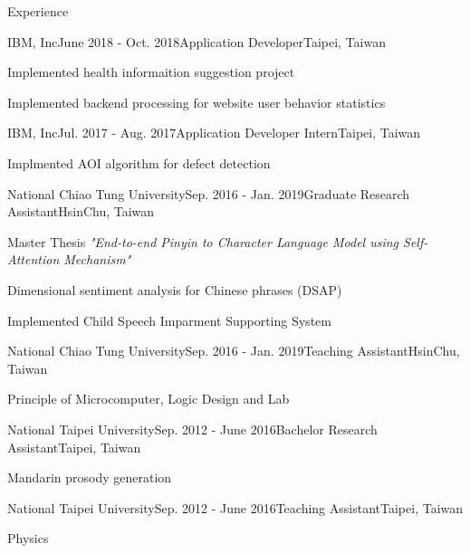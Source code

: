 \documentclass{resume} %
\begin{document}
\begin{rSection}{Experience}

\begin{rSubsection}{IBM, Inc}{June 2018 - Oct. 2018}{Application Developer}{Taipei, Taiwan}
\item Implemented health informaition suggestion project 
\item Implemented backend processing for website user behavior statistics 
\end{rSubsection}

\begin{rSubsection}{IBM, Inc}{Jul. 2017 - Aug. 2017}{Application Developer Intern}{Taipei, Taiwan}
\item Implmented AOI algorithm for defect detection 
\end{rSubsection}

\begin{rSubsection}{National Chiao Tung University}{Sep. 2016 - Jan. 2019}{Graduate Research Assistant}{HsinChu, Taiwan}
\item Master Thesis {\em "End-to-end Pinyin to Character Language Model using Self-Attention Mechanism"}
\item Dimensional sentiment analysis for Chinese phrases (DSAP) \cite{lee2017nctu}
\item Implemented Child Speech Imparment Supporting System 
\end{rSubsection}

\begin{rSubsection}{National Chiao Tung University}{Sep. 2016 - Jan. 2019}{Teaching Assistant}{HsinChu, Taiwan}
\item Principle of Microcomputer, Logic Design and Lab
\end{rSubsection}

\begin{rSubsection}{National Taipei University}{Sep. 2012 - June 2016}{Bachelor Research Assistant}{Taipei, Taiwan}
\item Mandarin prosody generation \cite{hung2014investigation}\cite{chiang2016improvements}\cite{chiang2019punctuation}
\end{rSubsection}

\begin{rSubsection}{National Taipei University}{Sep. 2012 - June 2016}{Teaching Assistant}{Taipei, Taiwan}
\item Physics
\end{rSubsection}


\end{rSection}
\end{document}
